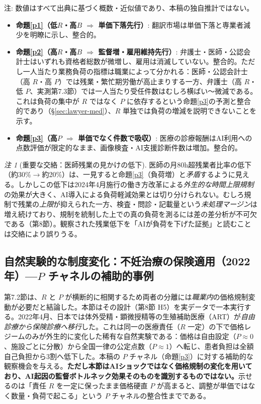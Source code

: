 \documentclass[11pt]{article}
\theoremstyle{plain}
\theoremstyle{definition}
\theoremstyle{remark}
\newtheorem*{rmk}{注}
\begin{document}
\noindent 注: 数値はすべて出典に基づく概数・近似値であり、本稿の独自推計ではない。

\begin{itemize}[leftmargin=1.4em,itemsep=2pt]
\item \textbf{命題\ref{p1}（低$R$・高$B$ $\Rightarrow$ 単価下落先行）}: 翻訳市場は単価下落と専業者減少を明瞭に示し、整合的。
\item \textbf{命題\ref{p2}（高$R$・高$B$ $\Rightarrow$ 監督増・雇用維持先行）}: 弁護士・医師・公認会計士はいずれも資格者総数が微増し、雇用は消滅していない。整合的。ただし一人当たり業務負荷の指標は職業によって分かれる：医師・公認会計士（高 $R$・高 $P$）では残業・繁忙期労働が高止まりする一方、弁護士（高 $R$・低 $P$、実測第7.3節）では一人当たり受任件数はむしろ横ばい〜微減である。これは負荷の集中が $R$ ではなく $P$ に依存するという命題\ref{p3}の予測と整合的であり（\S\ref{sec:lawyer-med}）、$R$ 単独では負荷の増減を説明できないことを示す。
\item \textbf{命題\ref{p3}（高$P$ $\Rightarrow$ 単価でなく件数で吸収）}: 医療の診療報酬はAI利用への点数評価が限定的なまま、画像検査・AI支援診断件数は増加。整合的。
\end{itemize}

\begin{rmk}[重要な交絡：医師残業の見かけの低下]
医師の月80h超残業者比率の低下（約30\%$\to$約20\%）は、一見すると命題\ref{p3}（負荷増）と\emph{矛盾}するように見える。しかしこの低下は2024年4月施行の働き方改革による\emph{外生的な時間上限規制}の効果が大きく、AI導入による負荷軽減効果とは切り分けられない。むしろ規制で残業の\emph{上限}が抑えられた一方、検査・問診・記載量という\emph{未処理マージン}は増え続けており、規制を統制した上での真の負荷を測るには差の差分析が不可欠である（第8節）。観察された残業低下を「AIが負荷を下げた証拠」と読むことは交絡により誤りうる。
\end{rmk}

\subsection{自然実験的な制度変化：不妊治療の保険適用（2022年）---$P$ チャネルの補助的事例}\label{sec:natexp}
第7.2節は、$R$ と $P$ が横断的に相関するため両者の分離には\emph{職業内}の価格規制変動が必要だと結論した。本節はその設計（第8節 H5）を実データで一本実行する。2022年4月、日本では体外受精・顕微授精等の生殖補助医療（ART）が\emph{自由診療から保険診療へ移行}した。これは同一の医療責任（$R$ 一定）の下で価格レジームのみが外生的に変化した稀有な自然実験である：価格は自由設定（$P\approx0$、施設ごとに分散）から全国一律の公定点数（$P\approx1$）へ転じ、患者負担は全額自己負担から3割へ低下した。本稿の $P$ チャネル（命題\ref{p3}）に対する補助的な観察機会を与える。\textbf{ただし本節はAIショックではなく価格規制の変化を用いており、AI起因の監督ボトルネック効果そのものを識別するものではない。}示せるのは「責任 $R$ を一定に保ったまま価格硬直 $P$ が高まると、調整が単価ではなく数量・負荷で起こる」という $P$ チャネルの整合性までである。
\end{document}

